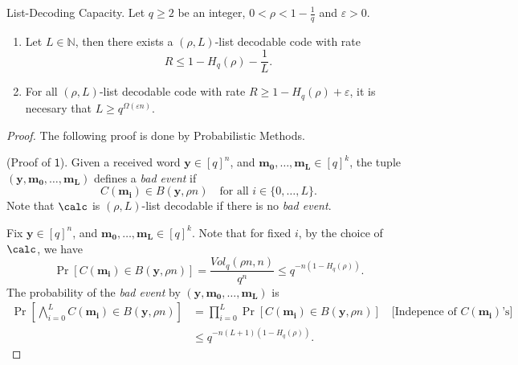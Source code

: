 	\begin{theorem}{List-Decoding Capacity.}{}
		Let $q\geq2$ be an integer, $0<\rho<1-\frac{1}{q}$ and $\varepsilon>0$.
		\begin{enumerate}[1.]
			\item Let $L\in\mathbb{N}$, then there exists a $(\rho, L)$-list decodable code with rate 
			\[
			R \leq 1 - H_q(\rho) - \frac{1}{L}.
			\]
			\item For all $(\rho, L)$-list decodable code with rate $R\geq 1 - H_q(\rho) + \varepsilon$, it is necesary that $L\geq q^{\Omega(\varepsilon n)}$.
		\end{enumerate}
	\end{theorem}
	\begin{proof}
		The following proof is done by Probabilistic Methods. 
		
		\vspace{0.01in}
		
\noindent \textsf{(Proof of $\mathsf{1}$).} Given a received word $\mathbf{y}\in[q]^n$, and $\mathbf{m_0}, \ldots, \mathbf{m_L}\in[q]^k$, the tuple $(\mathbf{y}, \mathbf{m_0}, \ldots, \mathbf{m_L})$ defines a \emph{bad event} if 
		\[
		C(\mathbf{m_i})\in B(\mathbf{y}, \rho n) \quad \text{for all $i\in\{0,\ldots,L\}$}.
		\]
		Note that $\calc$ is $(\rho, L)$-list decodable if there is no \emph{bad event}. 
		
		Fix $\mathbf{y}\in[q]^n$, and $\mathbf{m_0}, \ldots, \mathbf{m_L}\in[q]^k$. Note that for fixed $i$, by the choice of $\calc$, we have
		\[
		\Pr[C(\mathbf{m_i}) \in B(\mathbf{y}, \rho n)] = \frac{Vol_q(\rho n, n)}{q^n} \leq q^{-n(1 - H_q(\rho))}. 
		\]
		The probability of the \emph{bad event} by $(\mathbf{y}, \mathbf{m_0}, \ldots, \mathbf{m_L})$ is 
		\begin{align*}
			\Pr\left[\bigwedge_{i = 0}^L C(\mathbf{m_i})\in B(\mathbf{y}, \rho n)\right]  
			& =  \prod_{i = 0}^L \Pr[C(\mathbf{m_i})\in B(\mathbf{y}, \rho n)] \quad \text{[Indepence of $C(\mathbf{m_i})$'s]} \\
			& \leq q^{-n(L+1)(1 - H_q(\rho))}.
		\end{align*}
		

\end{proof}
